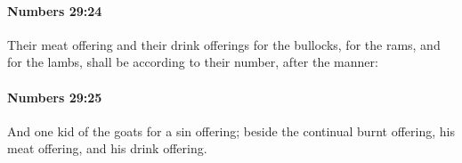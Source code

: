 		\paragraph{Numbers 29:24} %
			\label{NUMBERS-29-24}

			Their meat offering and their drink offerings for the bullocks, for the rams, and for the lambs, shall be according to their number, after the manner:


		\paragraph{Numbers 29:25} %
			\label{NUMBERS-29-25}

			And one kid of the goats for a sin offering; beside the continual burnt offering, his meat offering, and his drink offering.



